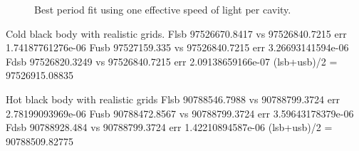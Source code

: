 \begin{figure}
    \centering
    \caption{Best period fit using one effective speed of light per cavity.}
    \label{fig:result_two_c}
\end{figure}



Cold black body with realistic grids.
Flsb  97526670.8417 vs 97526840.7215 err 1.74187761276e-06
Fusb  97527159.335 vs 97526840.7215 err 3.26693141594e-06
Fdsb  97526820.3249 vs 97526840.7215 err 2.09138659166e-07
(lsb+usb)/2 = 97526915.08835

Hot black body with realistic grids
Flsb  90788546.7988 vs 90788799.3724 err 2.78199093969e-06
Fusb  90788472.8567 vs 90788799.3724 err 3.59643178379e-06
Fdsb  90788928.484 vs 90788799.3724 err 1.42210894587e-06
(lsb+usb)/2 = 90788509.82775
